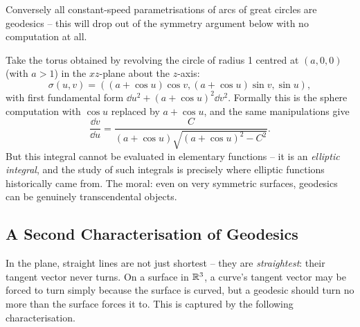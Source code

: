 \documentclass[a4paper]{scrartcl}
\begin{document}
\begin{example}
\begin{center}
    \end{center}
    Conversely all constant-speed parametrisations of arcs of great circles are geodesics -- this will drop out of the symmetry argument below with no computation at all.
\end{example}

\begin{example}
    Take the torus obtained by revolving the circle of radius 1 centred at $(a, 0, 0)$ (with $a > 1$) in the $xz$-plane about the $z$-axis:
    $$
    \sigma(u, v) = ((a + \cos u)\cos v, (a + \cos u)\sin v, \sin u),
    $$
    with first fundamental form $\dd u^2 + (a + \cos u)^2 \dd v^2$. Formally this is the sphere computation with $\cos u$ replaced by $a + \cos u$, and the same manipulations give
    $$
    \frac{\dd v}{\dd u} = \frac{C}{(a + \cos u)\sqrt{(a + \cos u)^2 - C^2}}.
    $$
    But this integral cannot be evaluated in elementary functions -- it is an \emph{elliptic integral}, and the study of such integrals is precisely where elliptic functions historically came from. The moral: even on very symmetric surfaces, geodesics can be genuinely transcendental objects.
\end{example}

\subsection{A Second Characterisation of Geodesics}

In the plane, straight lines are not just shortest -- they are \emph{straightest}: their tangent vector never turns. On a surface in $\mathbb{R}^3$, a curve's tangent vector may be forced to turn simply because the surface is curved, but a geodesic should turn no more than the surface forces it to. This is captured by the following characterisation.
\end{document}
